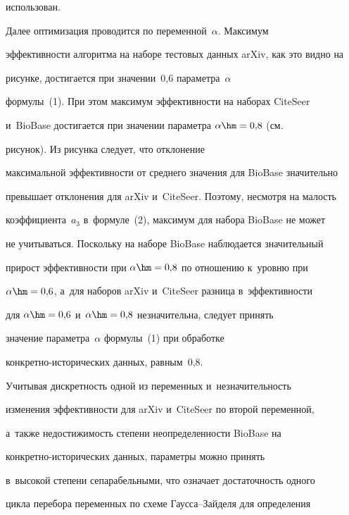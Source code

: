 использован. 


  


  Далее оптимизация проводится по переменной~$\alpha$. Максимум 


эффективности алгоритма на наборе тестовых данных arXiv, как это видно на 


рисунке, достигается при значении~0,6 па\-ра\-мет\-ра~$\alpha$ 


формулы~(1). При этом максимум эффективности на наборах CiteSeer 


и~BioBase достигается при значении па\-ра\-мет\-ра $\alpha\hm=0{,}8$ (см.\  


рисунок). Из рисунка следует, что отклонение 


максимальной эф\-фек\-тив\-ности от среднего значения для BioBase значительно 


превышает отклонения для arXiv и~CiteSeer. Поэтому, не\-смот\-ря на ма\-лость 


коэффициента~$a_3$ в~формуле~(2), максимум для набора BioBase не может 


не учитываться. Поскольку на наборе BioBase наблюдается значительный 


прирост эффективности при $\alpha\hm=0{,}8$ по отношению к~уров\-ню при 


$\alpha\hm=0{,}6$, а~для наборов arXiv и~CiteSeer разница в~эф\-фек\-тив\-ности 


для $\alpha\hm=0{,}6$ и~$\alpha\hm=0{,}8$ незначительна, следует принять 


значение па\-ра\-мет\-ра~$\alpha$ формулы~(1) при обработке  


кон\-крет\-но-ис\-то\-ри\-че\-ских данных, равным~0,8.


  


  


  Учитывая дискретность одной из переменных и~не\-зна\-чи\-тель\-ность 


изменения эф\-фек\-тив\-ности для arXiv и~CiteSeer по второй переменной, 


а~также недостижимость степени не\-опре\-де\-лен\-ности BioBase на  


кон\-крет\-но-ис\-то\-ри\-че\-ских данных, параметры можно принять 


в~высокой степени сепарабельными, что означает до\-ста\-точ\-ность одного 


цик\-ла перебора переменных по схеме Гаус\-са--Зай\-де\-ля для определения 


